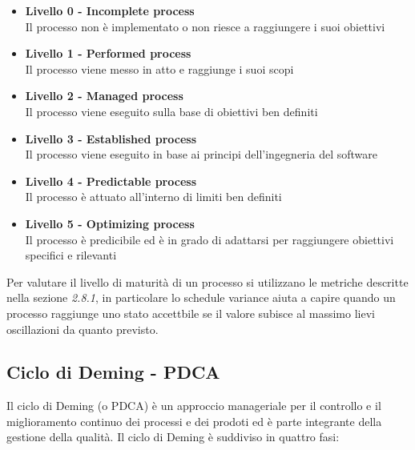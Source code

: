 {  \begin{itemize}
  \item \textbf{Livello 0 - Incomplete process}\\
    Il processo non è implementato o non riesce a raggiungere i suoi obiettivi
  \item \textbf{Livello 1 - Performed process}\\
    Il processo viene messo in atto e raggiunge i suoi scopi
  \item  \textbf{Livello 2 - Managed process}\\
    Il processo viene eseguito sulla base di obiettivi ben definiti
  \item  \textbf{Livello 3 - Established process}\\
    Il processo viene eseguito in base ai principi dell’ingegneria del software
  \item  \textbf{Livello 4 - Predictable process}\\
    Il processo è attuato all’interno di limiti ben definiti
  \item  \textbf{Livello 5 - Optimizing process}\\
    Il processo è predicibile ed è in grado di adattarsi per raggiungere obiettivi specifici e rilevanti
  \end{itemize}

  Per valutare il livello di maturità di un processo si utilizzano le
  metriche descritte nella sezione \emph{2.8.1}, in particolare lo
  schedule variance aiuta a capire quando un processo raggiunge uno
  stato accettbile se il valore subisce al massimo lievi oscillazioni
  da quanto previsto.





  \subsection{Ciclo di Deming -  PDCA}
  Il ciclo di Deming (o PDCA) è un approccio manageriale per il
  controllo e il
  miglioramento continuo dei processi e dei prodoti ed è
  parte integrante della gestione della qualità.
  Il ciclo di Deming è suddiviso in quattro fasi: \\



}
